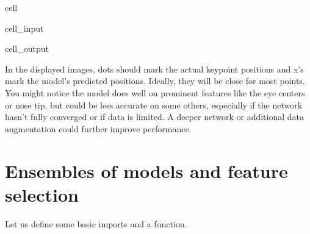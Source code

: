 \documentclass[letterpaper,10pt,english]{jupyterBook}
\begin{document}
\begin{sphinxuseclass}{cell}
\begin{sphinxVerbatimInput}
\begin{sphinxuseclass}{cell_input}
\end{sphinxuseclass}\end{sphinxVerbatimInput}
\begin{sphinxVerbatimOutput}

\begin{sphinxuseclass}{cell_output}
\noindent{}

\end{sphinxuseclass}\end{sphinxVerbatimOutput}

\end{sphinxuseclass}
\sphinxAtStartPar
In the displayed images,  dots should mark the actual keypoint positions and  x’s mark the model’s predicted positions. Ideally, they will be close for most points. You might notice the model does well on prominent features like the eye centers or nose tip, but could be less accurate on some others, especially if the network hasn’t fully converged or if data is limited. A deeper network or additional data augmentation could further improve performance.

\sphinxstepscope


\chapter{Ensembles of models and feature selection}
\label{\detokenize{05:ensembles-of-models-and-feature-selection}}\label{\detokenize{05::doc}}
\sphinxAtStartPar
Let us define some basic imports and a  function.
\end{document}
